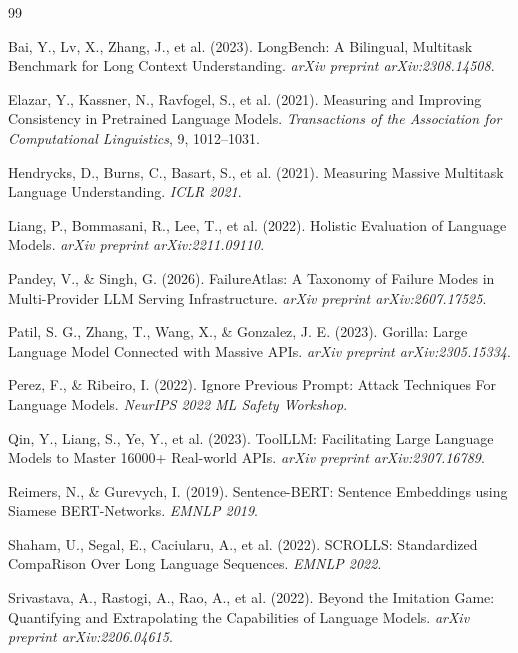 \documentclass[11pt]{article}
\begin{document}
\begin{thebibliography}{99}
\small

Bai, Y., Lv, X., Zhang, J., et al. (2023).
LongBench: A Bilingual, Multitask Benchmark for Long Context Understanding.
\emph{arXiv preprint arXiv:2308.14508}.

Elazar, Y., Kassner, N., Ravfogel, S., et al. (2021).
Measuring and Improving Consistency in Pretrained Language Models.
\emph{Transactions of the Association for Computational Linguistics}, 9, 1012--1031.

Hendrycks, D., Burns, C., Basart, S., et al. (2021).
Measuring Massive Multitask Language Understanding.
\emph{ICLR 2021}.

Liang, P., Bommasani, R., Lee, T., et al. (2022).
Holistic Evaluation of Language Models.
\emph{arXiv preprint arXiv:2211.09110}.

Pandey, V., \& Singh, G. (2026).
FailureAtlas: A Taxonomy of Failure Modes in Multi-Provider LLM Serving Infrastructure.
\emph{arXiv preprint arXiv:2607.17525}.

Patil, S. G., Zhang, T., Wang, X., \& Gonzalez, J. E. (2023).
Gorilla: Large Language Model Connected with Massive APIs.
\emph{arXiv preprint arXiv:2305.15334}.

Perez, F., \& Ribeiro, I. (2022).
Ignore Previous Prompt: Attack Techniques For Language Models.
\emph{NeurIPS 2022 ML Safety Workshop}.

Qin, Y., Liang, S., Ye, Y., et al. (2023).
ToolLLM: Facilitating Large Language Models to Master 16000+ Real-world APIs.
\emph{arXiv preprint arXiv:2307.16789}.

Reimers, N., \& Gurevych, I. (2019).
Sentence-BERT: Sentence Embeddings using Siamese BERT-Networks.
\emph{EMNLP 2019}.

Shaham, U., Segal, E., Caciularu, A., et al. (2022).
SCROLLS: Standardized CompaRison Over Long Language Sequences.
\emph{EMNLP 2022}.

Srivastava, A., Rastogi, A., Rao, A., et al. (2022).
Beyond the Imitation Game: Quantifying and Extrapolating the Capabilities of Language Models.
\emph{arXiv preprint arXiv:2206.04615}.


\end{thebibliography}
\end{document}
